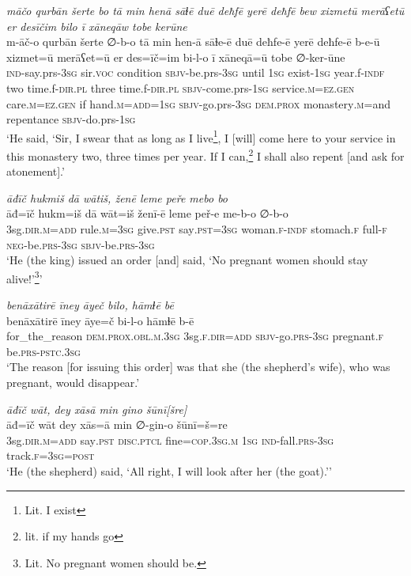 \ea \label{ŠJ.98}
\textit{māčo qurbān šerte bo tā min henā sāɫē duē deħfē yerē deħfē bew xizmetū merāʕetū er desīčim bilo ī xāneqāw tobe kerūne} \\ 
\gll m-āč-o qurbān šerte ∅-b-o tā min hen-ā sāɫe-ē duē deħfe-ē yerē deħfe-ē b-e-ū xizmet=ū merāʕet=ū er des=īč=im bi-l-o ī xāneqā=ū tobe ∅-ker-ūne \\ 
 \textsc{ind-}say.prs\textsc{-3sg} sir.\textsc{voc} condition \textsc{sbjv-}be.prs\textsc{-3sg} until \textsc{1sg} exist\textsc{-\textsc{1sg}} year.f\textsc{-indf} two time.f\textsc{-dir}\textsc{.pl} three time.f\textsc{-dir}\textsc{.pl} \textsc{sbjv-}come.prs\textsc{-\textsc{1sg}} service\textsc{.m}\textsc{=ez.gen} care\textsc{.m}\textsc{=ez.gen} if hand\textsc{.m}\textsc{=add}\textsc{=\textsc{1sg}} \textsc{sbjv-}go.prs\textsc{-3sg} \textsc{dem.prox} monastery\textsc{.m}=and repentance \textsc{sbjv-}do.prs\textsc{-\textsc{1sg}} \\ 
\glt `He said, ‘Sir, I swear that as long as I live\footnote{Lit. I exist}, I [will] come here to your service in this monastery two, three times per year. If I can,\footnote{lit. if my hands go} I shall also repent [and ask for atonement].'
\z 
 
\ea \label{KŠ.17}
\textit{āđīč hukmiš dā wātiš, ženē leme peře mebo bo} \\ 
\gll āđ=īč hukm=iš dā wāt=iš ženī-ē leme peř-e me-b-o ∅-b-o \\ 
 3sg\textsc{.dir}\textsc{.m}\textsc{=add} rule\textsc{.m}\textsc{=3sg} give\textsc{.pst} say\textsc{.pst}\textsc{=3sg} woman\textsc{.f}\textsc{-indf} stomach\textsc{.f} full\textsc{-f} \textsc{neg-}be\textsc{.prs}\textsc{-3sg} \textsc{sbjv-}be\textsc{.prs}\textsc{-3sg} \\ 
\glt `He (the king) issued an order [and] said, ‘No pregnant women should stay alive!’\footnote{Lit. No pregnant women should be.}'
\z 
 
\ea \label{KŠ.18}
\textit{benāxātirē īney āyeč bilo, hāmɫē bē} \\ 
\gll benāxātirē īney āye=č bi-l-o hāmɫē b-ē \\ 
 for\_the\_reason \textsc{dem.prox}\textsc{.obl}\textsc{.m}\textsc{.3sg} 3sg\textsc{.f}\textsc{.dir}\textsc{=add} \textsc{sbjv-}go\textsc{.prs}\textsc{-3sg} pregnant\textsc{.f} be\textsc{.prs}\textsc{-pstc}\textsc{.3sg} \\ 
\glt `The reason [for issuing this order] was that she (the shepherd’s wife), who was pregnant, would disappear.'
\z 
 
\ea \label{KŠ.29}
\textit{āđīč wāt, dey xāsā min gino šūnī[šre]} \\ 
\gll āđ=īč wāt dey xās=ā min ∅-gin-o šūnī=š=re \\ 
 3sg\textsc{.dir}\textsc{.m}\textsc{=add} say\textsc{.pst} \textsc{disc.ptcl} fine\textsc{=cop}\textsc{.3sg}\textsc{.m} \textsc{1sg} \textsc{ind-}fall\textsc{.prs}\textsc{-3sg} track\textsc{.f}\textsc{=3sg}\textsc{=\textsc{post}} \\ 
\glt `He (the shepherd) said, ‘All right, I will look after her (the goat).’'
\z 
 
